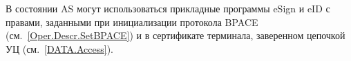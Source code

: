 В состоянии AS могут использоваться прикладные программы eSign и eID
с правами, заданными при инициализации протокола 
BPACE (см.~\ref{Oper.Descr.SetBPACE}) и в сертификате терминала,
заверенном цепочкой УЦ (см.~\ref{DATA.Access}).


